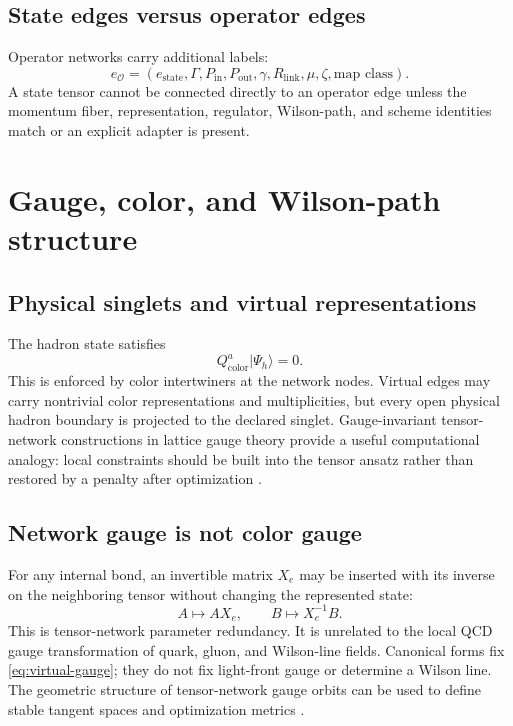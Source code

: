\documentclass[11pt]{article}
\newcommand{\cO}{\mathcal O}
\begin{document}
\subsection{State edges versus operator edges}

Operator networks carry additional labels:
\begin{equation}
 e_{\cO}=
 \left(
 e_{\mathrm{state}},
 \Gamma,
 P_{\mathrm{in}},P_{\mathrm{out}},
 \gamma,
 R_{\mathrm{link}},
 \mu,\zeta,
 \text{map class}
 \right).
\label{eq:operator-edge-type}
\end{equation}
A state tensor cannot be connected directly to an operator edge unless the
momentum fiber, representation, regulator, Wilson-path, and scheme identities
match or an explicit adapter is present.

\section{Gauge, color, and Wilson-path structure}
\label{sec:gauge-color}

\subsection{Physical singlets and virtual representations}

The hadron state satisfies
\begin{equation}
 Q^a_{\mathrm{color}}|\Psi_h\rangle=0.
\label{eq:color-singlet-tn}
\end{equation}
This is enforced by color intertwiners at the network nodes.  Virtual edges may
carry nontrivial color representations and multiplicities, but every open
physical hadron boundary is projected to the declared singlet.  Gauge-invariant
tensor-network constructions in lattice gauge theory provide a useful
computational analogy: local constraints should be built into the tensor ansatz
rather than restored by a penalty after optimization
\cite{Tagliacozzo2014,Canals2024}.

\subsection{Network gauge is not color gauge}

For any internal bond, an invertible matrix \(X_e\) may be inserted with its
inverse on the neighboring tensor without changing the represented state:
\begin{equation}
 A\longmapsto AX_e,
 \qquad
 B\longmapsto X_e^{-1}B.
\label{eq:virtual-gauge}
\end{equation}
This is tensor-network parameter redundancy.  It is unrelated to the local
QCD gauge transformation of quark, gluon, and Wilson-line fields.  Canonical
forms fix \cref{eq:virtual-gauge}; they do not fix light-front gauge or determine
a Wilson line.  The geometric structure of tensor-network gauge orbits can be
used to define stable tangent spaces and optimization metrics
\cite{Haegeman2014}.
\end{document}
